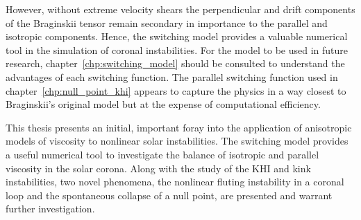 However, without extreme velocity shears the perpendicular and drift components of the Braginskii tensor remain secondary in importance to the parallel and isotropic components. Hence, the switching model provides a valuable numerical tool in the simulation of coronal instabilities. For the model to be used in future research, chapter~\ref{chp:switching_model} should be consulted to understand the advantages of each switching function. The parallel switching function used in chapter~\ref{chp:null_point_khi} appears to capture the physics in a way closest to Braginskii's original model but at the expense of computational efficiency.

This thesis presents an initial, important foray into the application of anisotropic models of viscosity to nonlinear solar instabilities. The switching model provides a useful numerical tool to investigate the balance of isotropic and parallel viscosity in the solar corona. Along with the study of the KHI and kink instabilities, two novel phenomena, the nonlinear fluting instability in a coronal loop and the spontaneous collapse of a null point, are presented and warrant further investigation.
